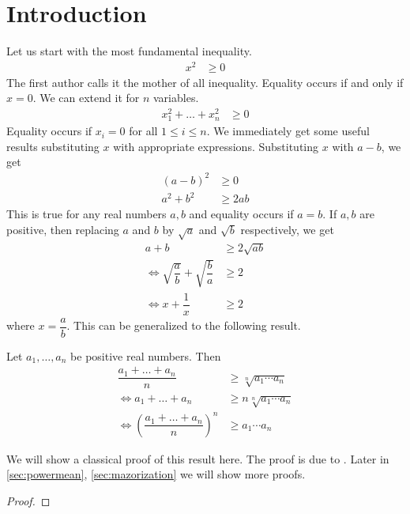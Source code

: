 \documentclass{subfile}
\begin{document}
	\section{Introduction}\label{sec:intro}%
	Let us start with the most fundamental inequality.
		\begin{align}
			x^2
				& \geq0\label{ineq:mother}
		\end{align}
	The first author calls it the mother of all inequality. Equality occurs if and only if $x=0$. We can extend it for $n$ variables.
		\begin{align}
			x_1^2+\ldots+x_n^2
				& \geq0\label{ineq:extendedmother}
		\end{align}
	Equality occurs if $x_i=0$ for all $1\leq i\leq n$. We immediately get some useful results substituting $x$ with appropriate expressions. Substituting $x$ with $a-b$, we get
		\begin{align*}
			(a-b)^2
				& \geq0\\
			a^2+b^2
				& \geq2ab
		\end{align*}
	This is true for any real numbers $a,b$ and equality occurs if $a=b$. If $a,b$ are positive, then replacing $a$ and $b$ by $\sqrt{a}$ and $\sqrt{b}$ respectively, we get
		\begin{align*}
			a+b
				& \geq2\sqrt{ab}\\
			\iff\sqrt{\dfrac{a}{b}}+\sqrt{\dfrac{b}{a}}
				& \geq2\\
			\iff x+\dfrac{1}{x}
				& \geq2
		\end{align*}
	where $x=\dfrac{a}{b}$. This can be generalized to the following result.
		\begin{theorem}\label{thm:amgm}
			Let $a_1,\ldots,a_n$ be positive real numbers. Then
				\begin{align*}
					\dfrac{a_1+\ldots+a_n}{n}
						& \geq\sqrt[n]{a_1\cdots a_n}\\
					\iff a_1+\ldots+a_n
						& \geq n\sqrt[n]{a_1\cdots a_n}\\
					\iff \left(\dfrac{a_1+\ldots+a_n}{n}\right)^n
						& \geq a_1\cdots a_n
				\end{align*}
		\end{theorem}
	We will show a classical proof of this result here. The proof is due to \textcite{cauchy_1821}. Later in \autoref{sec:powermean}, \autoref{sec:mazorization} we will show more proofs.
		\begin{proof}

		\end{proof}
\end{document}
